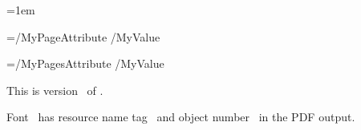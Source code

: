 
\pdfhorigin=1in         %

\pdfvorigin=1in         %


\pdfpagewidth=8.5in     %
\pdfpageheight=11in

\pdflinkmargin=1pt      %

\pdfdestmargin=10pt     %

\pdfthreadmargin=1em    %

\pdfpagesattr={/MyPageAttribute /MyValue}

\pdfpageattr={/MyPagesAttribute /MyValue}



This is version \the\pdftexversion \pdftexrevision\ of \pdfTeX.


Font \fontname\font\ has resource name tag
\pdffontname\font\ and object number \pdffontobjnum\font\ in the PDF output.

